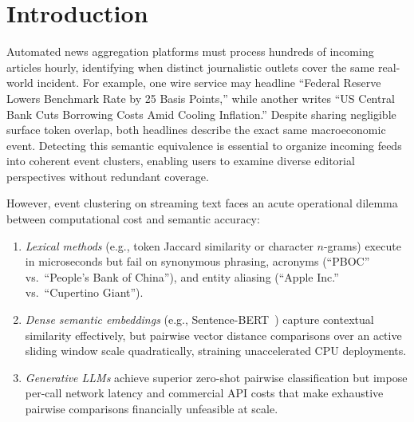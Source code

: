\documentclass[conference]{IEEEtran}
\begin{document}
\section{Introduction}

Automated news aggregation platforms must process hundreds of incoming articles hourly, identifying when distinct journalistic outlets cover the same real-world incident.
For example, one wire service may headline ``Federal Reserve Lowers Benchmark Rate by 25 Basis Points,'' while another writes ``US Central Bank Cuts Borrowing Costs Amid Cooling Inflation.''
Despite sharing negligible surface token overlap, both headlines describe the exact same macroeconomic event.
Detecting this semantic equivalence is essential to organize incoming feeds into coherent event clusters, enabling users to examine diverse editorial perspectives without redundant coverage.

However, event clustering on streaming text faces an acute operational dilemma between computational cost and semantic accuracy:
\begin{enumerate}
    \item \textit{Lexical methods} (e.g., token Jaccard similarity or character $n$-grams) execute in microseconds but fail on synonymous phrasing, acronyms (``PBOC'' vs.\ ``People's Bank of China''), and entity aliasing (``Apple Inc.'' vs.\ ``Cupertino Giant'').
    \item \textit{Dense semantic embeddings} (e.g., Sentence-BERT~\cite{reimers2019sentence}) capture contextual similarity effectively, but pairwise vector distance comparisons over an active sliding window scale quadratically, straining unaccelerated CPU deployments.
    \item \textit{Generative LLMs} achieve superior zero-shot pairwise classification but impose per-call network latency and commercial API costs that make exhaustive pairwise comparisons financially unfeasible at scale.
\end{enumerate}
\end{document}
